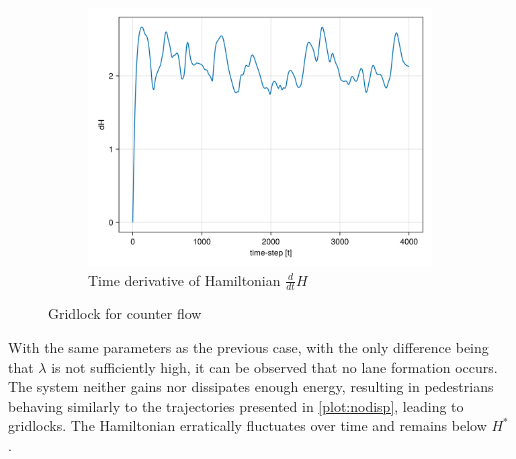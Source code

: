 \begin{itemize}
\begin{figure}[H]
\begin{subfigure}{.40\textwidth}
            \includegraphics[width=\linewidth]{figures/dH_counter_gridlock.png}
            \caption{Time derivative of Hamiltonian $\frac{d}{dt}H$}
            \label{plot:countergridlock_dh}
        \end{subfigure}
        \caption{Gridlock for counter flow}
        \label{plot:countergridlock}
    \end{figure}
With the same parameters as the previous case, with the only difference being that $\lambda$ is not sufficiently high, it can be observed that no lane formation occurs. The system neither gains nor dissipates enough energy, resulting in pedestrians behaving similarly to the trajectories presented in \autoref{plot:nodisp}, leading to gridlocks. The Hamiltonian erratically fluctuates over time and remains below $H^*$.


\end{itemize}
